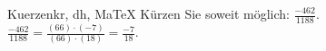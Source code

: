 \begin{MAufgabe}{Kuerzen}{kr, dh, MaTeX}
K\"urzen Sie soweit m\"oglich: $\frac{-462}{1188}$.\\ 
\ifLsg\MLoesung
\quad $\frac{-462}{1188}=\frac{(66)\cdot(-7)}{(66)\cdot(18)}=\frac{-7}{18}$.\else\relax\fi
 \end{MAufgabe}